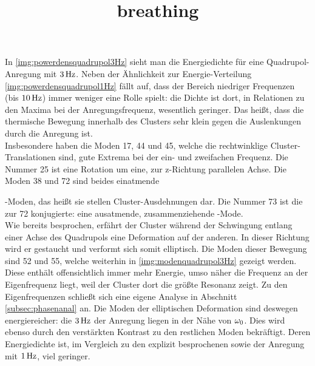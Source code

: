           In \autoref{img:powerdensquadrupol3Hz} sieht man die Energiedichte für eine Quadrupol-Anregung mit $\unit[3]{Hz}$. Neben der Ähnlichkeit zur Energie-Verteilung \autoref{img:powerdensquadrupol1Hz} fällt auf, dass der Bereich niedriger Frequenzen (bis $\unit[10]{Hz}$) immer weniger eine Rolle spielt: die Dichte ist dort, in Relationen zu den Maxima bei der Anregungsfrequenz, wesentlich geringer. Das heißt, dass die thermische Bewegung innerhalb des Clusters sehr klein gegen die Auslenkungen durch die Anregung ist.\\
          Insbesondere haben die Moden 17, 44 und 45, welche die rechtwinklige Cluster-Translationen sind, gute Extrema bei der ein- und zweifachen Frequenz. Die Nummer 25 ist eine Rotation um eine, zur z-Richtung parallelen Achse. Die Moden 38 und 72 sind beides einatmende \title{breathing}-Moden, das heißt sie stellen Cluster-Ausdehnungen dar. Die Nummer 73 ist die zur 72 konjugierte: eine ausatmende, zusammenziehende -Mode.\\
          Wie bereits besprochen, erfährt der Cluster während der Schwingung entlang einer Achse des Quadrupols eine Deformation auf der anderen. In dieser Richtung wird er gestaucht und verformt sich somit elliptisch.  Die Moden dieser Bewegung sind 52 und 55, welche weiterhin in \autoref{img:modenquadrupol3Hz} gezeigt werden. Diese enthält offensichtlich immer mehr Energie, umso näher die Frequenz an der Eigenfrequenz liegt, weil der Cluster dort die größte Resonanz zeigt. Zu den Eigenfrequenzen schließt sich eine eigene Analyse in Abschnitt \ref{subsec:phasenanal} an. Die Moden der elliptischen Deformation sind deswegen energiereicher: die $\unit[3]{Hz}$ der Anregung liegen in der Nähe von $\omega_\text{0}$. Dies wird ebenso durch den verstärkten Kontrast zu den restlichen Moden bekräftigt. Deren Energiedichte ist, im Vergleich zu den explizit besprochenen sowie der Anregung mit $\unit[1]{Hz}$, viel geringer.

